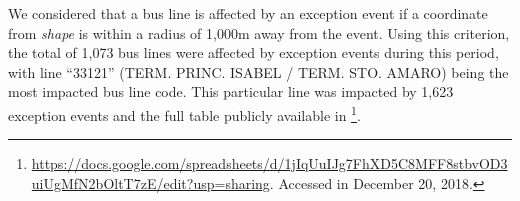 \documentclass[runningheads]{llncs}
\begin{document}
We considered that a bus line is affected by an exception event if a coordinate from \textit{shape} is within a radius of 1,000m away from the event. Using this criterion, the total of 1,073 bus lines were affected by exception events during this period, with line ``33121'' (TERM. PRINC. ISABEL / TERM. STO. AMARO) being the most impacted bus line code. This particular line was impacted by 1,623 exception events and the full table publicly available in \footnote{\url{https://docs.google.com/spreadsheets/d/1jIqUuIJg7FhXD5C8MFF8stbvOD3uiUgMfN2bOltT7zE/edit?usp=sharing}. Accessed in December 20, 2018.}.

\end{document}
